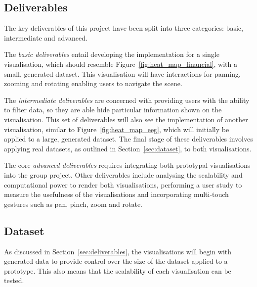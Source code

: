 \documentclass[
	fontsize=11pt
	headlines=2,
	footlines=2,
	parskip=half
]{scrartcl}
\begin{document}
{		\subsection{Deliverables} {
		\label{sec:deliverables}

			The key deliverables of this project have been split into three categories: basic, intermediate and advanced.

			The \emph{basic deliverables} entail developing the implementation for a single visualisation, which should resemble Figure~\ref{fig:heat_map_financial}, with a small, generated dataset. This visualisation will have interactions for panning, zooming and rotating enabling users to navigate the scene.

			The \emph{intermediate deliverables} are concerned with providing users with the ability to filter data, so they are able hide particular information shown on the visualisation. This set of deliverables will also see the implementation of another visualisation, similar to Figure~\ref{fig:heat_map_eeg}, which will initially be applied to a large, generated dataset. The final stage of these deliverables involves applying real datasets, as outlined in Section~\ref{sec:dataset}, to both visualisations.

			The core \emph{advanced deliverables} requires integrating both prototypal visualisations into the group project. Other deliverables include analysing the scalability and computational power to render both visualisations, performing a user study to measure the usefulness of the visualisations and incorporating multi-touch gestures such as pan, pinch, zoom and rotate.

		}

		\subsection{Dataset} {
		\label{sec:dataset}

			As discussed in Section~\ref{sec:deliverables}, the visualisations will begin with generated data to provide control over the size of the dataset applied to a prototype. This also means that the scalability of each visualisation can be tested. 

}}
\end{document}
